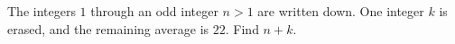 The integers $1$ through an odd integer $n>1$ are written down. One integer $k$ is erased, and the remaining average is $22$. Find $n+k$.
